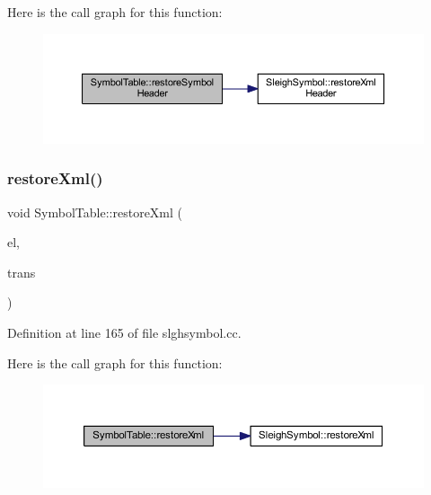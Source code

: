 Here is the call graph for this function\+:
\nopagebreak
\begin{figure}[H]
\begin{center}
\leavevmode
\includegraphics[width=350pt]{class_symbol_table_aeb92078f011975c7da3a906187baed21_cgraph}
\end{center}
\end{figure}
\mbox{\label{class_symbol_table_a015f2273420eca3b76e82bab4b006ddc}} 
\subsubsection{\texorpdfstring{restoreXml()}{restoreXml()}}
{\footnotesize\ttfamily void Symbol\+Table\+::restore\+Xml (\begin{DoxyParamCaption}\item[{const \mbox{\hyperlink{class_element}{Element}} $\ast$}]{el,  }\item[{\mbox{\hyperlink{class_sleigh_base}{Sleigh\+Base}} $\ast$}]{trans }\end{DoxyParamCaption})}



Definition at line 165 of file slghsymbol.\+cc.

Here is the call graph for this function\+:
\nopagebreak
\begin{figure}[H]
\begin{center}
\leavevmode
\includegraphics[width=350pt]{class_symbol_table_a015f2273420eca3b76e82bab4b006ddc_cgraph}
\end{center}
\end{figure}
\mbox{\label{class_symbol_table_a9b483237599214e761b8724ef50dd691}} 
